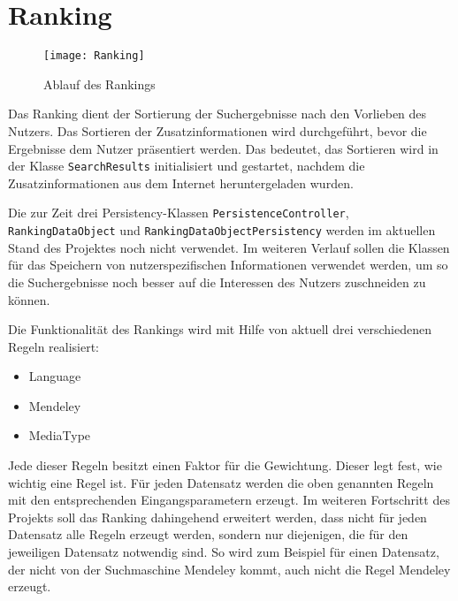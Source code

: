 
\section{Ranking}

\begin{figure}[ht]
	\centering
	\texttt{[image: Ranking]}
	\caption{Ablauf des Rankings}
\end{figure}

Das Ranking dient der Sortierung der Suchergebnisse nach den Vorlieben des Nutzers. Das Sortieren der Zusatzinformationen wird durchgeführt, bevor die Ergebnisse dem Nutzer präsentiert werden. Das bedeutet, das Sortieren wird in der Klasse \lstinline|SearchResults| initialisiert und gestartet, nachdem die Zusatzinformationen aus dem Internet heruntergeladen wurden.

Die zur Zeit drei Persistency-Klassen \lstinline|PersistenceController|, \lstinline|RankingDataObject| und \lstinline|RankingDataObjectPersistency| werden im aktuellen Stand des Projektes noch nicht verwendet. Im weiteren Verlauf sollen die Klassen für das Speichern von nutzerspezifischen Informationen verwendet werden, um so die Suchergebnisse noch besser auf die Interessen des Nutzers zuschneiden zu können.

Die Funktionalität des Rankings wird mit Hilfe von aktuell drei verschiedenen Regeln realisiert:

\begin{itemize}
	\item Language
	\item Mendeley
	\item MediaType
\end{itemize}

Jede dieser Regeln besitzt einen Faktor für die Gewichtung. Dieser legt fest, wie wichtig eine Regel ist. Für jeden Datensatz werden die oben genannten Regeln mit den entsprechenden Eingangsparametern erzeugt. Im weiteren Fortschritt des Projekts soll das Ranking dahingehend erweitert werden, dass nicht für jeden Datensatz alle Regeln erzeugt werden, sondern nur diejenigen, die für den jeweiligen Datensatz notwendig sind. So wird zum Beispiel für einen Datensatz, der nicht von der Suchmaschine Mendeley kommt, auch nicht die Regel \glqq Mendeley\grqq\xspace erzeugt. 

